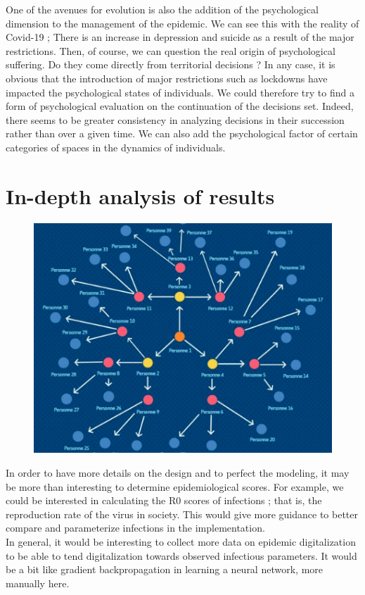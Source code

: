 One of the avenues for evolution is also the addition of the psychological dimension to the management of the epidemic. We can see this with the reality of Covid-19 ; There is an increase in depression and suicide as a result of the major restrictions. Then, of course, we can question the real origin of psychological suffering. Do they come directly from territorial decisions ? In any case, it is obvious that the introduction of major restrictions such as lockdowns have impacted the psychological states of individuals. We could therefore try to find a form of psychological evaluation on the continuation of the decisions set. Indeed, there seems to be greater consistency in analyzing decisions in their succession rather than over a given time. We can also add the psychological factor of certain categories of spaces in the dynamics of individuals.\\

\section{In-depth analysis of results}

\begin{figure}[h]
  \centering
  \includegraphics[width=0.8\linewidth]{Media/R0.png}
  \caption{}
  \label{fig:r0}
\end{figure}

In order to have more details on the design and to perfect the modeling, it may be more than interesting to determine epidemiological scores. For example, we could be interested in calculating the R0 scores of infections ; that is, the reproduction rate of the virus in society. This would give more guidance to better compare and parameterize infections in the implementation.\\

In general, it would be interesting to collect more data on epidemic digitalization to be able to tend digitalization towards observed infectious parameters. It would be a bit like gradient backpropagation in learning a neural network, more manually here.\\